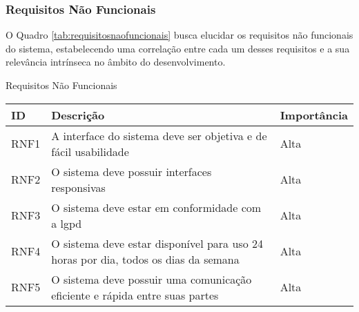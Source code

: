 \pagebreak
\subsubsection{Requisitos Não Funcionais}
\label{sec:req_nao_funcinais}

O Quadro \ref{tab:requisitosnaofuncionais} busca elucidar os requisitos não funcionais do sistema, estabelecendo uma correlação entre cada um desses requisitos e a sua relevância intrínseca no âmbito do desenvolvimento.

\begin{quadro}[h!]
\centering
\caption{Requisitos Não Funcionais}
\label{tab:requisitosnaofuncionais}
\begin{longtable}{|p{2.5cm}|p{10.0cm}|p{2.5cm}|}
\hline
ID & Descrição & Importância
\\\hline
RNF1 & A interface do sistema deve ser objetiva e de fácil usabilidade & Alta
\\\hline
RNF2 & O sistema deve possuir interfaces responsivas & Alta
\\\hline
RNF3 & O sistema deve estar em conformidade com a \ac{lgpd} & Alta
\\\hline
RNF4 & O sistema deve estar disponível para uso 24 horas por dia, todos os dias da semana & Alta
\\\hline
RNF5 & O sistema deve possuir uma comunicação eficiente e rápida entre suas partes & Alta
\\\hline
\end{longtable}
\end{quadro}